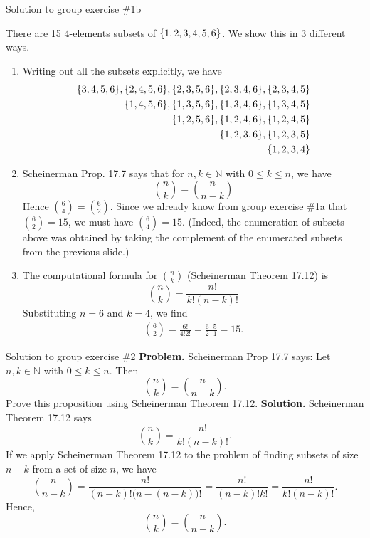 \documentclass[10pt]{beamer}
\begin{document}
\begin{frame}{Solution to group exercise \#1b}
\footnotesize

 There are 15 4-elements subsets of $\{ {1,2,3,4,5,6} \}$.  We show this in 3 different ways. 
\begin{enumerate} 
	\item Writing out all the subsets explicitly, we have
%
\begin{align*}
\{ {3,4,5,6} \}, \{ {2,4,5,6} \}, \{ {2,3,5,6} \}, \{ {2,3,4,6} \}, \{ {2,3,4,5} \} \\
\{ {1,4,5,6} \}, \{ {1,3,5,6} \}, \{ {1,3,4,6} \}, \{ {1,3,4,5} \} \\
\{ {1,2,5,6} \}, \{ {1,2,4,6} \}, \{ {1,2,4,5} \} \\
\{ {1,2,3,6} \}, \{ {1,2,3,5} \} \\
\{ {1,2,3,4} \} 
\end{align*}
%
\item Scheinerman Prop. 17.7  says that for $n,k \in \mathbb{N}$ with $0 \leq k \leq n$, we have  
\[ \binom{n}{k} = \binom{n}{n-k}\]
Hence  $\binom{6}{4} = \binom{6}{2}$. Since we already know from group exercise \#1a that $\binom{6}{2}=15$, we must have  $\binom{6}{4}=15$. (Indeed, the enumeration of subsets above was obtained by taking the complement of the enumerated subsets from the previous slide.) 
\item The computational formula for $\binom{n}{k}$ (Scheinerman Theorem 17.12) is 
\[ \binom{n}{k}  = \frac{n!}{k! (n-k)!}\] 
Substituting $n=6$ and $k=4$, we find
%
\begin{align*}
\binom{6}{2} = \frac{6!}{4!2!} = \frac{6 \cdot 5}{2 \cdot 1} = 15. 
\end{align*}
\end{enumerate}
\end{frame}

\begin{frame}{Solution to group exercise \#2}
\textbf{Problem.} Scheinerman Prop 17.7 says: Let $n,k \in \mathbb{N}$ with $0 \leq k \leq n$.  Then 
		\[ \binom{n}{k} = \binom{n}{n-k}. \]
	Prove this proposition using Scheinerman  Theorem 17.12. 
\vfill 
\textbf{Solution.} Scheinerman  Theorem 17.12 says
		\[ \binom{n}{k} = \frac{n!}{k!(n-k)!}. \] 
	If we apply Scheinerman  Theorem 17.12 to the problem of finding subsets of size $n-k$ from a set of size $n$, we have
	\[ \binom{n}{n-k} = \frac{n!}{(n-k)!\big(n-(n-k) \big)!} = \frac{n!}{(n-k)!k!} = \frac{n!}{k!(n-k)!}.  \]
Hence,
\[ \binom{n}{k} = \binom{n}{n-k}. \]
			
\end{frame}
\end{document}
